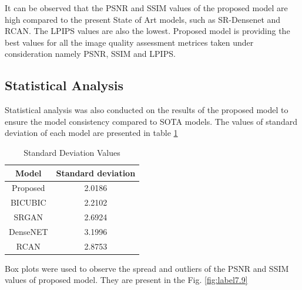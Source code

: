 It can be observed that the PSNR and SSIM values of the proposed model are high compared to the present State of Art models, such as SR-Densenet and RCAN. The LPIPS values are also the lowest. Proposed model is providing the best values for all the image quality assessment metrices taken under consideration namely PSNR, SSIM and LPIPS. 
\subsection{Statistical Analysis}

Statistical analysis was also conducted on the results of the proposed model to ensure the model consistency compared to SOTA models. The values of standard deviation of each model are presented in table \ref{Table:7.1}       

\begin{table}[H]
\centering
\caption{Standard Deviation Values}
\begin{tabular}{ |c|c| }
\hline
 Model & Standard deviation \\ 
  \hline
 Proposed &	2.0186\\
 \hline
 BICUBIC & 2.2102\\
 \hline
 SRGAN \cite{SRGAN} &  2.6924\\
 \hline
 DenseNET \cite{DenseNET} & 3.1996\\
 \hline
 RCAN \cite{RCAN} &	 2.8753\\
 \hline
\end{tabular}
\label{Table:7.1}
\end{table}

Box plots were used to observe the spread and outliers of the PSNR and SSIM values of proposed model. They are present in the Fig. \ref{fig:label7.9}

